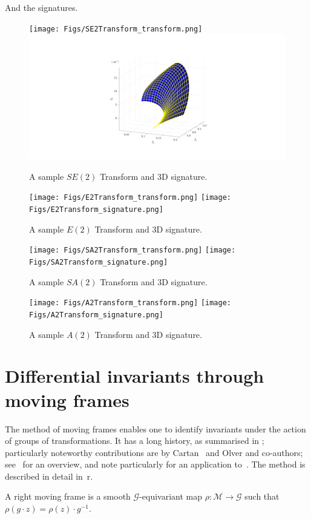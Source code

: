 \documentclass[review,onefignum,onetabnum]{siamonline190516}
\begin{document}
And the signatures.

\begin{figure}
\centering
\texttt{[image: Figs/SE2Transform\_transform.png]}
\includegraphics[width=.45\textwidth]{Figs/SE2Transform_signature.png}
\caption{A sample $SE(2)$ Transform and 3D signature.}
\label{fig:SE2}
\end{figure}

\begin{figure}
\centering
\texttt{[image: Figs/E2Transform\_transform.png]}
\texttt{[image: Figs/E2Transform\_signature.png]}
\caption{A sample $E(2)$ Transform and 3D signature.}
\label{fig:E2}
\end{figure}

\begin{figure}
\centering
\texttt{[image: Figs/SA2Transform\_transform.png]}
\texttt{[image: Figs/SA2Transform\_signature.png]}
\caption{A sample $SA(2)$ Transform and 3D signature.}
\label{fig:SA2}
\end{figure}

\begin{figure}
\centering
\texttt{[image: Figs/A2Transform\_transform.png]}
\texttt{[image: Figs/A2Transform\_signature.png]}
\caption{A sample $A(2)$ Transform and 3D signature.}
\label{fig:A2}
\end{figure}

\section{Differential invariants through moving frames}

The method of moving frames enables one to identify invariants under the action of groups of transformations. It has a long history, as summarised in \cite{Olver14}; particularly noteworthy contributions are by Cartan~\cite{Cartan37} and Olver and co-authors; see~\cite{Olver14} for an overview, and note particularly for an application to~\cite{Calabi98}. The method is described in detail in~\cite{OlverCIT}r.

A right moving frame is a smooth $\mathcal{G}$-equivariant map $\rho : \mathcal{M} \to \mathcal{G}$ such that $\rho (g \cdot z) = \rho(z) \cdot g^{-1}$. 
\end{document}
